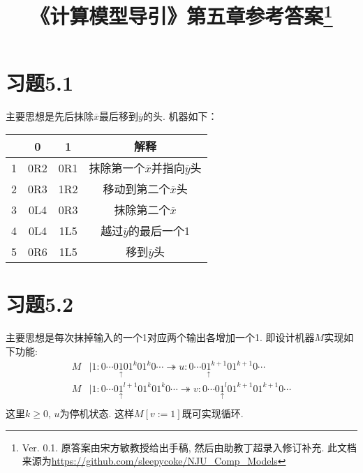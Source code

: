 \documentclass{article}
\newcommand*{\pt}[1]{\ensuremath{\underset{\uparrow}{#1}}}
\begin{document}
\title{《计算模型导引》第五章参考答案\footnote{Ver. 0.1. 原答案由宋方敏教授给出手稿, 然后由助教丁超录入修订补充. 此文档来源为\url{https://github.com/sleepycoke/NJU_Comp_Models}}}
\maketitle

\section*{习题5.1}
主要思想是先后抹除$\overline x$最后移到$\overline y$的头. 
机器如下：
\begin{center}
	
\begin{tabular}{|c|c|c|c|}
	\hline
	&0&1&解释\\
	\hline
	1&0R2&0R1&抹除第一个$\overline x$并指向$\overline y$头\\
	2&0R3&1R2&移动到第二个$\overline x$头\\
	3&0L4&0R3&抹除第二个$\overline x$\\
	4&0L4&1L5&越过$\overline y$的最后一个1\\
	5&0R6&1L5&移到$\overline y$头\\
	\hline
\end{tabular}
\end{center}


\section*{习题5.2}
主要思想是每次抹掉输入的一个1对应两个输出各增加一个1. 
即设计机器$M$实现如下功能:\\
\begin{align*}
	M &| 1 : 0\cdots0\pt101^k01^k0\cdots \twoheadrightarrow u : 0\cdots0\pt1^{k+1}01^{k+1}0\cdots\\
	M &| 1 : 0\cdots0\pt1^{l+1}01^k01^k0\cdots \twoheadrightarrow v : 0\cdots0\pt1^l01^{k+1}01^{k+1}0\cdots\\
\end{align*}
这里$k\ge 0$, $u$为停机状态. 这样$M[v:=1]$既可实现循环. 
\end{document}

